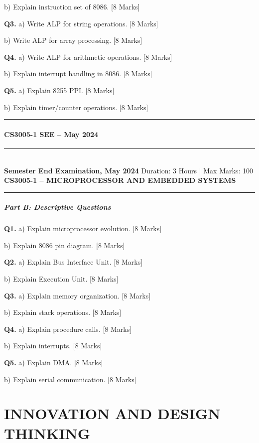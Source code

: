 \documentclass[11pt,a4paper]{article}
\newcommand{\examheader}[4]{
\noindent\rule{\textwidth}{0.5pt}\\
\textbf{#1} \hfill Duration: #3 | Max Marks: #4\\
\textbf{#2}\\
\rule{\textwidth}{0.5pt}
\vspace{0.2cm}
}
\begin{document}
b) Explain instruction set of 8086. \hfill [8 Marks]

\textbf{Q3.} a) Write ALP for string operations. \hfill [8 Marks]

b) Write ALP for array processing. \hfill [8 Marks]

\textbf{Q4.} a) Write ALP for arithmetic operations. \hfill [8 Marks]

b) Explain interrupt handling in 8086. \hfill [8 Marks]

\textbf{Q5.} a) Explain 8255 PPI. \hfill [8 Marks]

b) Explain timer/counter operations. \hfill [8 Marks]

\vspace{0.5cm}
\hrule
\vspace{0.5cm}

\subsection{CS3005-1 SEE -- May 2024}
\examheader{Semester End Examination, May 2024}{CS3005-1 -- MICROPROCESSOR AND EMBEDDED SYSTEMS}{3 Hours}{100}

\subsubsection*{Part B: Descriptive Questions}

\textbf{Q1.} a) Explain microprocessor evolution. \hfill [8 Marks]

b) Explain 8086 pin diagram. \hfill [8 Marks]

\textbf{Q2.} a) Explain Bus Interface Unit. \hfill [8 Marks]

b) Explain Execution Unit. \hfill [8 Marks]

\textbf{Q3.} a) Explain memory organization. \hfill [8 Marks]

b) Explain stack operations. \hfill [8 Marks]

\textbf{Q4.} a) Explain procedure calls. \hfill [8 Marks]

b) Explain interrupts. \hfill [8 Marks]

\textbf{Q5.} a) Explain DMA. \hfill [8 Marks]

b) Explain serial communication. \hfill [8 Marks]

\newpage
\part{INNOVATION AND DESIGN THINKING}
\end{document}
